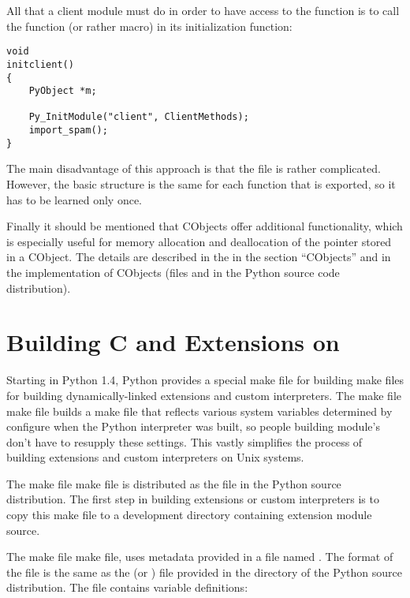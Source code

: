 \documentclass{manual}
\begin{document}
All that a client module must do in order to have access to the
function  is to call the function (or
rather macro)  in its initialization
function:

\begin{verbatim}
void
initclient()
{
    PyObject *m;

    Py_InitModule("client", ClientMethods);
    import_spam();
}
\end{verbatim}

The main disadvantage of this approach is that the file
 is rather complicated. However, the
basic structure is the same for each function that is
exported, so it has to be learned only once.

Finally it should be mentioned that CObjects offer additional
functionality, which is especially useful for memory allocation and
deallocation of the pointer stored in a CObject. The details
are described in the  in the section ``CObjects'' and in the
implementation of CObjects (files  and
 in the Python source code distribution).


\chapter{Building C and \Cpp{} Extensions on \UNIX{}
         \label{building-on-unix}}





Starting in Python 1.4, Python provides a special make file for
building make files for building dynamically-linked extensions and
custom interpreters.  The make file make file builds a make file
that reflects various system variables determined by configure when
the Python interpreter was built, so people building module's don't
have to resupply these settings.  This vastly simplifies the process
of building extensions and custom interpreters on Unix systems.

The make file make file is distributed as the file
 in the Python source distribution.  The
first step in building extensions or custom interpreters is to copy
this make file to a development directory containing extension module
source.

The make file make file,  uses metadata
provided in a file named .  The format of the 
file is the same as the  (or ) file
provided in the  directory of the Python source
distribution.  The  file contains variable definitions:
\end{document}

